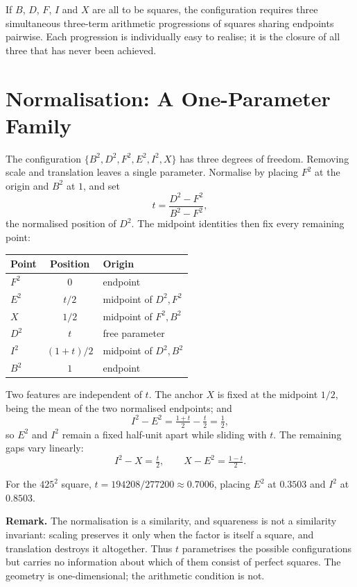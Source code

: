 \documentclass[12pt]{article}
\begin{document}
If $B$, $D$, $F$, $I$ and $X$ are all to be squares, the configuration
requires three simultaneous three-term arithmetic progressions of
squares sharing endpoints pairwise. Each progression is individually
easy to realise; it is the closure of all three that has never been
achieved.

\section{Normalisation: A One-Parameter Family}

The configuration $\{B^2, D^2, F^2, E^2, I^2, X\}$ has three degrees of
freedom. Removing scale and translation leaves a single parameter.
Normalise by placing $F^2$ at the origin and $B^2$ at $1$, and set
\[
t = \frac{D^2 - F^2}{B^2 - F^2},
\]
the normalised position of $D^2$. The midpoint identities then fix
every remaining point:

\begin{center}
\begin{tabular}{lcl}
\hline
Point & Position & Origin \\
\hline
$F^2$ & $0$           & endpoint \\
$E^2$ & $t/2$         & midpoint of $D^2, F^2$ \\
$X$   & $1/2$         & midpoint of $F^2, B^2$ \\
$D^2$ & $t$           & free parameter \\
$I^2$ & $(1+t)/2$     & midpoint of $D^2, B^2$ \\
$B^2$ & $1$           & endpoint \\
\hline
\end{tabular}
\end{center}

Two features are independent of $t$. The anchor $X$ is fixed at the
midpoint $1/2$, being the mean of the two normalised endpoints; and
\[
I^2 - E^2 = \tfrac{1+t}{2} - \tfrac{t}{2} = \tfrac12 ,
\]
so $E^2$ and $I^2$ remain a fixed half-unit apart while sliding with
$t$. The remaining gaps vary linearly:
\[
I^2 - X = \tfrac{t}{2}, \qquad X - E^2 = \tfrac{1-t}{2}.
\]

For the $425^2$ square, $t = 194208/277200 \approx 0.7006$, placing
$E^2$ at $0.3503$ and $I^2$ at $0.8503$.

\medskip
\noindent\textbf{Remark.} The normalisation is a similarity, and
squareness is not a similarity invariant: scaling preserves it only
when the factor is itself a square, and translation destroys it
altogether. Thus $t$ parametrises the possible configurations but
carries no information about which of them consist of perfect squares.
The geometry is one-dimensional; the arithmetic condition is not.
\end{document}
